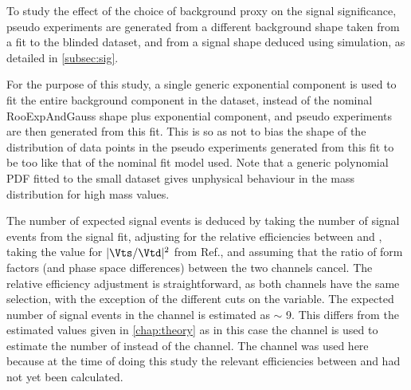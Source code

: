 To study the effect of the choice of background proxy on the signal significance, pseudo experiments are generated from a different background shape taken from a fit to the blinded \Lbpi dataset, and from a signal shape deduced using simulation, as detailed in \autoref{subsec:sig}.%

For the purpose of this study, a single generic exponential component is used to fit the entire background component in the \Lbpi dataset, instead of the nominal RooExpAndGauss shape plus exponential component, and pseudo experiments are then generated from this fit. 
This is so as not to bias the shape of the distribution of data points in the pseudo experiments generated from this fit to be too like that of the nominal fit model used. Note that a generic polynomial PDF fitted to the small \Lbpi dataset gives unphysical behaviour in the mass distribution for high mass values. 



The number of expected signal events is deduced by taking the number of signal events from the \LbK signal fit, adjusting for the relative efficiencies between \Lbpi and \LbK, taking the value for $|\Vts/\Vtd|^{2}$ from Ref.\cite{vtdvts}, and assuming that the ratio of form factors (and phase space differences) between the two channels cancel. The relative efficiency adjustment is straightforward, as both channels have the same selection, with the exception of the different cuts on the \dllkpi variable. The expected number of signal events in the \Lbpi channel is estimated as $\sim$ 9. This differs from the estimated values given in \autoref{chap:theory} as in this case the \LbK channel is used to estimate the number of \Lbpi instead of the \Lbpijpsi channel. The \LbK channel was used here because at the time of doing this study the relevant efficiencies between \Lbpi and \Lbpijpsi had not yet been calculated.





